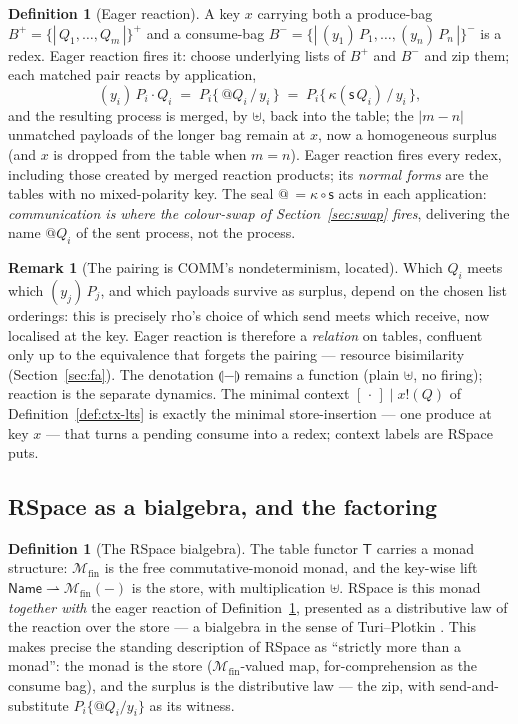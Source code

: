 \documentclass[11pt]{article}
\makeatletter
\newcommand{\swp}{\mathsf{s}}                  %
\newcommand{\kt}{\kappa}                       %
\newcommand{\Par}{\mathbin{\mid}}
\newcommand{\out}[2]{#1\mathbin{!}(#2)}
\newcommand{\quo}[1]{@#1}
\newcommand{\abs}[2]{(#1)\,#2}                  %
\newcommand{\Name}{\mathsf{Name}}
\newcommand{\sem}[1]{\llparenthesis #1\rrparenthesis}   %
\newcommand{\hole}{[\,\cdot\,]}                %
\newcommand{\Tab}{\mathsf{T}}                  %
\newcommand{\bag}[1]{\{\!|\,#1\,|\!\}}         %
\newcommand{\Mfin}{\mathcal{M}_{\mathrm{fin}}} %
\newcommand{\uplusk}{\mathbin{\uplus}}         %
\theoremstyle{plain}
\theoremstyle{definition}
\newtheorem{definition}[theorem]{Definition}
\newtheorem{remark}[theorem]{Remark}
\makeatother
\begin{document}
\begin{definition}[Eager reaction]\label{def:eager}
A key $x$ carrying both a produce-bag $B^{+}=\bag{Q_1,\dots,Q_m}^{+}$ and a
consume-bag $B^{-}=\bag{\abs{y_1}{P_1},\dots,\abs{y_n}{P_n}}^{-}$ is a redex.
Eager reaction fires it: choose underlying lists of $B^{+}$ and $B^{-}$ and zip
them; each matched pair reacts by application,
\[
  \abs{y_i}{P_i}\cdot Q_i \;=\; P_i\{\,\quo{Q_i}\,/\,y_i\,\}
                          \;=\; P_i\{\,\kt(\swp\,Q_i)\,/\,y_i\,\},
\]
and the resulting process is merged, by $\uplusk$, back into the table; the
$\lvert m-n\rvert$ unmatched payloads of the longer bag remain at $x$, now a
homogeneous surplus (and $x$ is dropped from the table when $m=n$). Eager reaction
fires every redex, including those created by merged reaction products; its
\emph{normal forms} are the tables with no mixed-polarity key. The seal
$\quo{\,}=\kt\circ\swp$ acts in each application: \emph{communication is where the
colour-swap of Section~\ref{sec:swap} fires}, delivering the name $\quo{Q_i}$ of
the sent process, not the process.
\end{definition}

\begin{remark}[The pairing is COMM's nondeterminism, located]\label{rem:pairing}
Which $Q_i$ meets which $\abs{y_j}{P_j}$, and which payloads survive as surplus,
depend on the chosen list orderings: this is precisely rho's choice of which send
meets which receive, now localised at the key. Eager reaction is therefore a
\emph{relation} on tables, confluent only up to the equivalence that forgets the
pairing --- resource bisimilarity (Section~\ref{sec:fa}). The denotation $\sem{-}$
remains a function (plain $\uplusk$, no firing); reaction is the separate dynamics.
The minimal context $\hole\Par\out x Q$ of Definition~\ref{def:ctx-lts} is exactly
the minimal store-insertion --- one produce at key $x$ --- that turns a pending
consume into a redex; context labels are RSpace puts.
\end{remark}

\subsection{RSpace as a bialgebra, and the factoring}

\begin{definition}[The RSpace bialgebra]\label{def:bialg}
The table functor $\Tab$ carries a monad structure: $\Mfin$ is the free
commutative-monoid monad, and the key-wise lift $\Name\rightharpoonup\Mfin(-)$ is
the store, with multiplication $\uplusk$. RSpace is this monad \emph{together with}
the eager reaction of Definition~\ref{def:eager}, presented as a distributive law
of the reaction over the store --- a bialgebra in the sense of Turi--Plotkin
\cite{turiplotkin}. This makes precise the standing description of RSpace as
``strictly more than a monad'': the monad is the store ($\Mfin$-valued map,
for-comprehension as the consume bag), and the surplus is the distributive law ---
the zip, with send-and-substitute $P_i\{\quo{Q_i}/y_i\}$ as its witness.
\end{definition}
\end{document}
